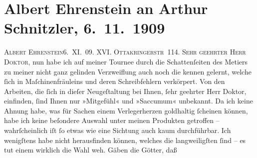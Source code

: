 

               \section[Albert Ehrenstein an Arthur Schnitzler, 6. 11. 1909]{ Albert Ehrenstein an Arthur Schnitzler, 6. 11. 1909}\nopagebreak{}\rehead{ }\begin{ledgroupsized}[t]{13cm}\normalsize\beginnumbering{} \toendnotes[C]{\smallbreak\pagebreak[2]} 
\pstart
           {\pb}\textsc{Albert Ehrenstein}\hfill 6. XI. 09.
                        \pend
           \pstart
           \textsc{XVI. Ottakringerstr 114.}\pend
           \pstart{}\textsc{Sehr geehrter Herr Doktor,}\pend\pstart
           nun habe ich auf meiner Tournee durch die Schattenſeiten des Metiers zu meiner
                    nicht ganz gelinden Verzweiflung auch noch die kennen gelernt, welche ſich in
                    Maſchinenfräuleins und deren Schreibfehlern verkörpert. Von den Arbeiten, die
                    ſich in dieſer Neugeſtaltung bei Ihnen, ſehr geehrter Herr Doktor, einfinden,
                    ſind Ihnen nur »Mitgefühl« und »Saccumum« unbekannt.\pend
           \pstart
           Da ich keine Ahnung habe, was für Sachen einem Verlegerherzen goldhaltig ſcheinen
                    können, habe ich keine beſondere Auswahl {\pb}unter meinen
                    Produkten getroffen – wahrſcheinlich iſt ſo etwas wie eine Sichtung auch kaum
                    durchführbar. Ich wenigſtens habe nicht herausfinden können, welches die
                    langweiligſten ſind – es tut einem wirklich die Wahl weh. Gäben die Götter, daß

\end{ledgroupsized}
